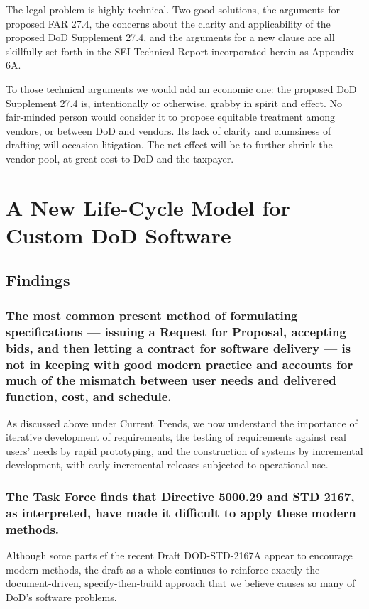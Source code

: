 \documentclass[12pt,final]{article}
\begin{document}
The legal problem is highly technical. Two good solutions, the arguments for
proposed FAR 27.4, the concerns about the clarity and applicability of the
proposed DoD Supplement 27.4, and the arguments for a new clause are all
skillfully set forth in the SEI Technical Report incorporated herein as
Appendix 6A.

To those technical arguments we would add an economic one: the proposed DoD
Supplement 27.4 is, intentionally or otherwise, grabby in spirit and effect. No
fair-minded person would consider it to propose equitable treatment among
vendors, or between DoD and vendors. Its lack of clarity and clumsiness of
drafting will occasion litigation. The net effect will be to further shrink the
vendor pool, at great cost to DoD and the taxpayer.

\section{A New Life-Cycle Model for Custom DoD Software}

\subsection*{Findings}

\subsubsection*{The most common present method of formulating specifications —
issuing a Request for Proposal, accepting bids, and then letting a contract for
software delivery — is not in keeping with good modern practice and accounts
for much of the mismatch between user needs and delivered function, cost, and
schedule.}

As discussed above under Current Trends, we now understand the importance of
iterative development of requirements, the testing of requirements against real
users’ needs by rapid prototyping, and the construction of systems by
incremental development, with early incremental releases subjected to
operational use.

\subsubsection*{The Task Force finds that Directive 5000.29 and STD 2167, as
interpreted, have made it difficult to apply these modern methods.}

Although some parts ef the recent Draft DOD-STD-2167A appear to encourage
modern methods, the draft as a whole continues to reinforce exactly the
document-driven, specify-then-build approach that we believe causes so many of
DoD’s software problems.
\end{document}
